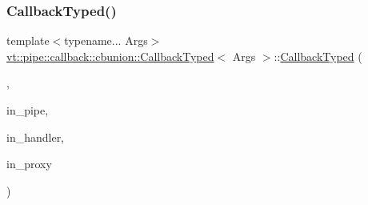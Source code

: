 \subsubsection{\texorpdfstring{Callback\+Typed()}{CallbackTyped()}\hspace{0.1cm}{\footnotesize\ttfamily [11/12]}}
{\footnotesize\ttfamily template$<$typename... Args$>$ \\
\hyperlink{structvt_1_1pipe_1_1callback_1_1cbunion_1_1_callback_typed}{vt\+::pipe\+::callback\+::cbunion\+::\+Callback\+Typed}$<$ Args $>$\+::\hyperlink{structvt_1_1pipe_1_1callback_1_1cbunion_1_1_callback_typed}{Callback\+Typed} (\begin{DoxyParamCaption}\item[{Raw\+Bcast\+Obj\+Grp\+Tag\+Type}]{,  }\item[{\hyperlink{namespacevt_ac9852acda74d1896f48f406cd72c7bd3}{Pipe\+Type}}]{in\+\_\+pipe,  }\item[{\hyperlink{namespacevt_af64846b57dfcaf104da3ef6967917573}{Handler\+Type}}]{in\+\_\+handler,  }\item[{\hyperlink{namespacevt_ad7cae989df485fccca57f0792a880a8e}{Obj\+Group\+Proxy\+Type}}]{in\+\_\+proxy }\end{DoxyParamCaption})\hspace{0.3cm}{\ttfamily [inline]}}

\mbox{\label{structvt_1_1pipe_1_1callback_1_1cbunion_1_1_callback_typed_aa4dab73febea8b4e76bf20881fb9993d}} 
